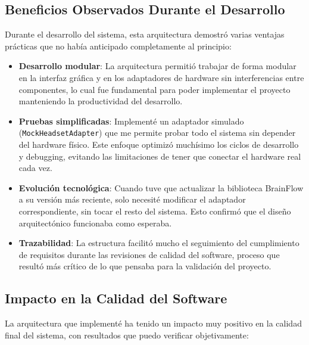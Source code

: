\newpage
\subsection{Beneficios Observados Durante el Desarrollo}

Durante el desarrollo del sistema, esta arquitectura demostró varias ventajas prácticas que no había anticipado completamente al principio:

\begin{itemize}
    \item \textbf{Desarrollo modular}: La arquitectura permitió trabajar de forma modular en la interfaz gráfica y en los adaptadores de hardware sin interferencias entre componentes, lo cual fue fundamental para poder implementar el proyecto manteniendo la productividad del desarrollo.
    
    \item \textbf{Pruebas simplificadas}: Implementé un adaptador simulado (\texttt{MockHeadsetAdapter}) que me permite probar todo el sistema sin depender del hardware físico. Este enfoque optimizó muchísimo los ciclos de desarrollo y debugging, evitando las limitaciones de tener que conectar el hardware real cada vez.
    
    \item \textbf{Evolución tecnológica}: Cuando tuve que actualizar la biblioteca BrainFlow a su versión más reciente, solo necesité modificar el adaptador correspondiente, sin tocar el resto del sistema. Esto confirmó que el diseño arquitectónico funcionaba como esperaba.
    
    \item \textbf{Trazabilidad}: La estructura facilitó mucho el seguimiento del cumplimiento de requisitos durante las revisiones de calidad del software, proceso que resultó más crítico de lo que pensaba para la validación del proyecto.
\end{itemize}

\subsection{Impacto en la Calidad del Software}

La arquitectura que implementé ha tenido un impacto muy positivo en la calidad final del sistema, con resultados que puedo verificar objetivamente:

